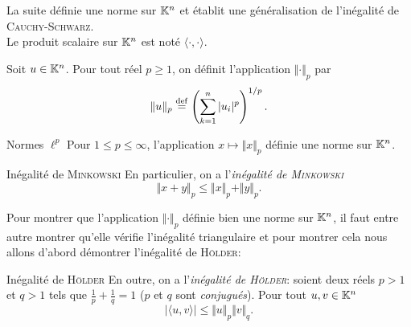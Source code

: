 La suite définie une norme sur $\mathbb{K}^n$ et établit une généralisation de l'inégalité de \textsc{Cauchy}-\textsc{Schwarz}. \\
Le produit scalaire sur $\mathbb{K}^n$ est noté $\langle \cdot, \cdot \rangle$.

\begin{defi}{}
    Soit $u \in \mathbb{K}^n$. Pour tout réel $p \geqslant 1$, on définit l'application $\Vert \bm{\cdot} \Vert_p$ par
    $$\Vert u \Vert_p \overset{\mathrm{\tiny def}}{=} \left (\sum_{k=1}^{n} |u_i|^p \right)^{1/p}.$$
\end{defi}


\begin{prop}{Normes $\ell^p$}
    Pour $1 \leqslant p \leqslant \infty$, l'application $x \mapsto \Vert x \Vert_p$ définie une norme sur $\mathbb{K}^n$. 
\end{prop}

\begin{prop}{Inégalité de \textsc{Minkowski}}
    En particulier, on a l'\emph{inégalité de \textsc{Minkowski}}
    $$\Vert x + y \Vert_p \leqslant \Vert x \Vert_p + \Vert y \Vert_p.$$
\end{prop}

Pour montrer que l'application $\Vert \bm{\cdot} \Vert_p$ définie bien une norme sur $\mathbb{K}^n$, il faut entre autre montrer qu'elle vérifie l'inégalité triangulaire et pour montrer cela nous allons d'abord démontrer l'inégalité de \textsc{Hölder}:

\begin{prop}{Inégalité de \textsc{Hölder}}
    En outre, on a l'\emph{inégalité de \textsc{Hölder}}: soient deux réels $p > 1$ et $q > 1$ tels que $\frac{1}{p} + \frac{1}{q} = 1$ ($p$ et $q$ sont \emph{conjugués}). Pour tout $u, v \in \mathbb{K}^n$
    $$\big|\langle u, v \rangle\big| \leqslant \Vert u \Vert_p \Vert v \Vert_q.$$
\end{prop}

